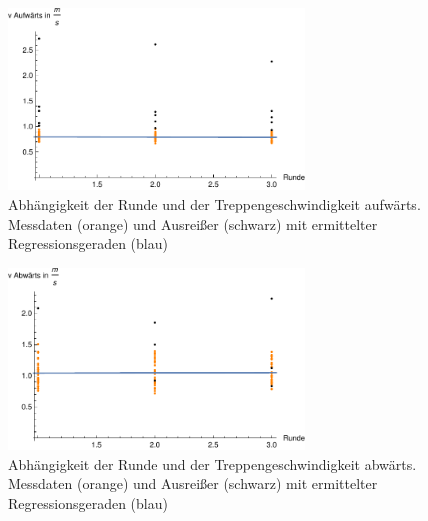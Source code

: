\begin{figure}[htpb]
	\centering
	\includegraphics[width=0.7\textwidth]{abbildungen/regression/2012_2017_verbund/ohneausreisser/auf-runde.pdf}
	
	\caption{Abhängigkeit der Runde und der Treppengeschwindigkeit aufwärts. Messdaten (orange) und Ausreißer (schwarz) mit ermittelter Regressionsgeraden (blau)}
	\label{fig:2012_und_2017_MA_auf_runde}
\end{figure}



\begin{figure}[htpb]
	\centering
	\includegraphics[width=0.7\textwidth]{abbildungen/regression/2012_2017_verbund/ohneausreisser/ab-runde.pdf}
	
	\caption{Abhängigkeit der Runde und der Treppengeschwindigkeit abwärts. Messdaten (orange) und Ausreißer (schwarz) mit ermittelter Regressionsgeraden (blau)}
	\label{fig:2012_und_2017_MA_ab_runde}
\end{figure}




